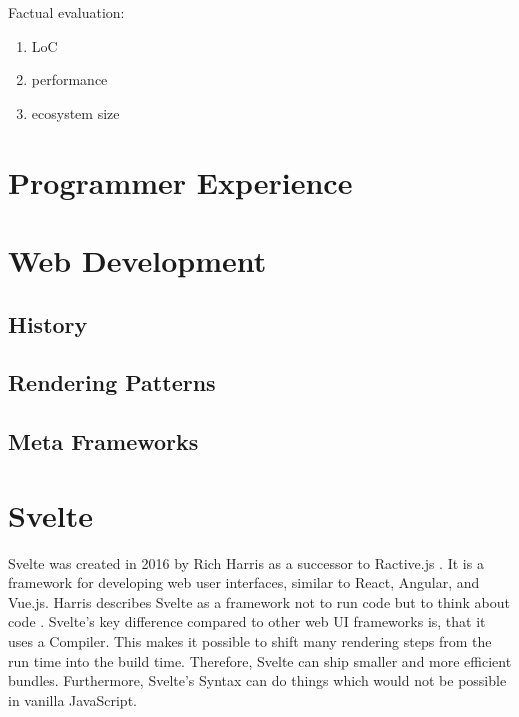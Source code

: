 Factual evaluation:
\begin{enumerate}
    \item LoC
    \item performance
    \item ecosystem size
\end{enumerate}

\section{Programmer Experience}


\section{Web Development}
\label{sec:web-development}

\subsection{History}

\subsection{Rendering Patterns}

\subsection{Meta Frameworks}

\section{Svelte}
\label{sec:svelte}

% 
% 
% 
% 

Svelte was created in 2016 by Rich Harris as a successor to Ractive.js \cite{offerzen_origins_svelte_2022}. It is a framework for developing web user interfaces, similar to React, Angular, and Vue.js. Harris describes Svelte as a framework not to run code but to think about code \cite{offerzen_origins_svelte_2022}. Svelte's key difference compared to other web UI frameworks is, that it uses a Compiler. This makes it possible to shift many rendering steps from the run time into the build time. Therefore, Svelte can ship smaller and more efficient bundles. Furthermore, Svelte's Syntax can do things which would not be possible in vanilla JavaScript.


